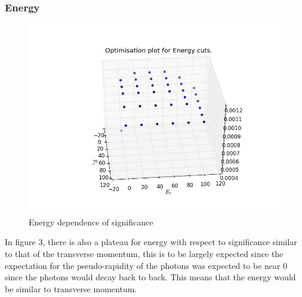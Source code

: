 \documentclass{article}
\begin{document}
\subsubsection{Energy}
\begin{figure}
\includegraphics[scale=0.5]{energy6}
\caption{Energy dependence of significance}
\end{figure}
In figure 3, there is also a plateau for energy with respect to significance similar to that of the transverse momentum, this is to be largely expected since the expectation for the pseudo-rapidity of the photons was expected to be near $0$ since the photons would decay back to back. This means that the energy would be similar to transverse momentum. 
\end{document}
